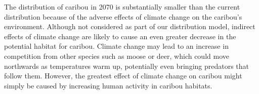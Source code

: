 \documentclass[twoside]{article}
\begin{document}
\indent The distribution of caribou in 2070 is substantially smaller
than the current distribution because of the adverse effects of climate
change on the caribou’s environment. Although not considered as part of
our distribution model, indirect effects of climate change are likely
to cause an even greater decrease in the potential habitat for caribou.
Climate change may lead to an increase in competition from other species
such as moose or deer, which could move northwards as temperatures warm up,
potentially even bringing predators that follow them. However, the greatest
effect of climate change on caribou might simply be caused by increasing
human activity in caribou habitats.

\small



\end{document}
